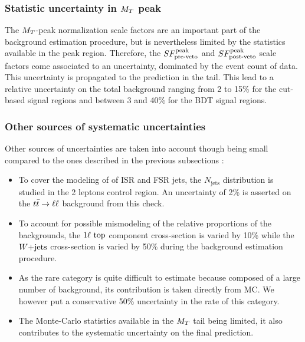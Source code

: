             \subsubsection{Statistic uncertainty in $M_T$ peak}

            The $M_T$-peak normalization scale factors are an important part of the background
            estimation procedure, but is nevertheless limited by the statistics available
            in the peak region. Therefore, the $SF_{\text{pre-veto}}^{\text{peak}}$ and $SF_{\text{post-veto}}^{\text{peak}}$ scale factors come
            associated to an uncertainty, dominated by the event count of data. This
            uncertainty is propagated to the prediction in the tail. This lead to a
            relative uncertainty on the total background ranging from 2 to 15\% for the cut-based
            signal regions and between 3 and 40\% for the BDT signal regions.

            \subsubsection{Other sources of systematic uncertainties}

            Other sources of uncertainties are taken into account though being small compared
            to the ones described in the previous subsections :
            \begin{itemize}
                \item To cover the modeling of of ISR and FSR jets, the $N_\text{jets}$
                      distribution is studied in the 2 leptons control region. An
                      uncertainty of 2\% is asserted on the $t\bar{t} \rightarrow \ell \ell$ background
                      from this check.
                \item To account for possible mismodeling of the relative proportions of
                      the backgrounds, the $1\ell~\text{top}$ component cross-section
                      is varied by 10\% while the $\text{$W$+jets}$ cross-section is varied by 50\%
                      during the background estimation procedure.
                \item As the rare category is quite difficult to estimate because composed
                      of a large number of background, its contribution is taken directly
                      from MC. We however put a conservative 50\% uncertainty in the
                      rate of this category.
                \item The Monte-Carlo statistics available in the $M_T$ tail being limited,
                      it also contributes to the systematic uncertainty on the final prediction.
            \end{itemize}

